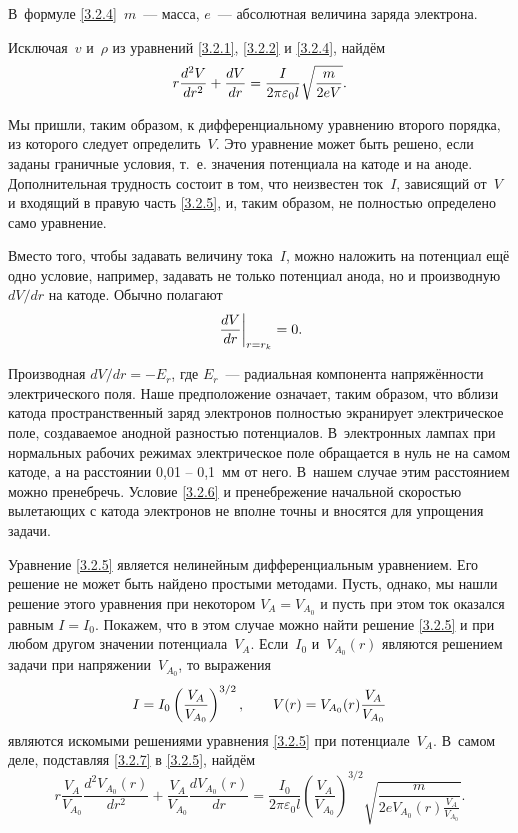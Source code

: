 В~формуле \eqref{3.2.4}~$m$~--- масса, $e$~--- абсолютная величина заряда
электрона.

Исключая~$v$ и~$\rho$ из уравнений \eqref{3.2.1}, \eqref{3.2.2} и \eqref{3.2.4},
найдём
\begin{equation}
r\frac{d^2V}{dr^2}+\frac{dV}{dr}=
\frac{I}{2\pi\varepsilon_0l}\sqrt{\frac{m}{2eV}}.
	\eqmark{3.2.5}
\end{equation}

Мы пришли, таким образом, к дифференциальному уравнению второго порядка, из
которого следует определить~$V$. Это
уравнение может быть решено, если заданы граничные условия, т.~е. значения
потенциала на катоде и на аноде.
Дополнительная трудность состоит в том, что неизвестен ток~$I$, зависящий от~$V$
и входящий в правую часть \eqref{3.2.5}, и, таким образом, не полностью
определено само уравнение.

Вместо того, чтобы задавать величину тока~$I$, можно наложить на потенциал ещё
одно условие, например, задавать не только потенциал анода, но и производную
$dV/dr$ на катоде. Обычно полагают
\begin{equation}
	\left.\frac{dV}{dr}\right|_{r=r_k}=0.
	\eqmark{3.2.6}
\end{equation}

Производная $dV/dr=-E_r$, где $E_r$~--- радиальная компонента напряжённости
электрического поля. Наше предположение
означает, таким образом, что вблизи катода пространственный заряд электронов
полностью экранирует электрическое поле, создаваемое анодной разностью
потенциалов. В~электронных лампах при нормальных рабочих режимах электрическое
поле обращается в нуль не на самом катоде, а на расстоянии 0,01 -- 0,1~мм от
него. В~нашем случае этим расстоянием можно пренебречь. Условие \eqref{3.2.6} и
пренебрежение начальной скоростью вылетающих с катода электронов не вполне точны
и вносятся для упрощения задачи.

Уравнение \eqref{3.2.5} является нелинейным дифференциальным уравнением. Его
решение не может быть найдено простыми методами. Пусть, однако, мы нашли решение
этого уравнения при некотором $V_A=V_{A_0}$ и пусть при этом ток оказался равным
$I=I_0$. Покажем, что в этом случае можно найти решение \eqref{3.2.5} и при
любом другом значении потенциала~$V_A$. Если~$I_0$ и~$V_{A_0}(r)$ являются
решением задачи при напряжении~$V_{A_0}$, то выражения
\begin{equation}
	I=I_0\left(\frac{V_A}{V_{A_0}}\right)^{3/2},\qquad
V(r)=V_{A_0}(r)\frac{V_A}{V_{A_0}}
	\eqmark{3.2.7}
\end{equation}
являются искомыми решениями уравнения \eqref{3.2.5} при потенциале~$V_A$.
В~самом деле, подставляя \eqref{3.2.7} в \eqref{3.2.5}, найдём
\begin{equation*}
	r\frac{V_A}{V_{A_0}} \frac{d^2V_{A_0}(r)}{dr^2}+\frac{V_A}{V_{A_0}}
\frac{dV_{A_0}(r)}{dr}=
\frac{I_0}{2\pi\varepsilon_0l} \left( \frac{V_A}{V_{A_0}} \right)^{3/2} \sqrt{
\frac{m}{2eV_{A_0}(r )\frac{V_A}{V_{A_0}}}}.
\end{equation*}

